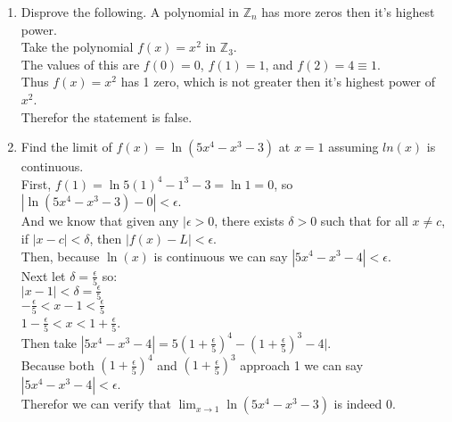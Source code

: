 \documentclass[sigconf]{article}
\begin{document}
\begin{enumerate}
  \item Disprove the following. A polynomial in $\mathbb{Z}_n$ has more zeros then it's highest power.\\
        Take the polynomial $f(x)=x^2$ in $\mathbb{Z}_3$.\\
        The values of this are $f(0)=0$, $f(1)=1$, and $f(2)=4\equiv 1$.\\
        Thus $f(x)=x^2$ has 1 zero, which is not greater then it's highest power of $x^2$.\\
        Therefor the statement is false.

  \item Find the limit of $f(x)=\ln(5x^4-x^3-3)$ at $x=1$ assuming $ln(x)$ is continuous.\\
        First, $f(1)=\ln5(1)^4-1^3-3=\ln1=0$, so $|\ln(5x^4-x^3-3)-0|<\epsilon$.\\
        And we know that given any $|\epsilon>0$, there exists $\delta>0$ such that for all $x\neq c$, if $|x-c|<\delta$, then $|f(x)-L|<\epsilon$.\\
        Then, because $\ln(x)$ is continuous we can say $|5x^4-x^3-4|<\epsilon$.\\
        Next let $\delta=\frac{\epsilon}{5}$ so:\\
        $|x-1|<\delta=\frac{\epsilon}{5}$\\
        $-\frac{\epsilon}{5}<x-1<\frac{\epsilon}{5}$\\
        $1-\frac{\epsilon}{5}<x<1+\frac{\epsilon}{5}$.\\
        Then take $|5x^4-x^3-4|=5(1+\frac{\epsilon}{5})^4-(1+\frac{\epsilon}{5})^3-4|$.\\
        Because both $(1+\frac{\epsilon}{5})^4$ and $(1+\frac{\epsilon}{5})^3$ approach 1 we can say $|5x^4-x^3-4|<\epsilon$.\\
        Therefor we can verify that $\lim_{x\to1}\ln(5x^4-x^3-3)$ is indeed 0.





\end{enumerate}
\end{document}
